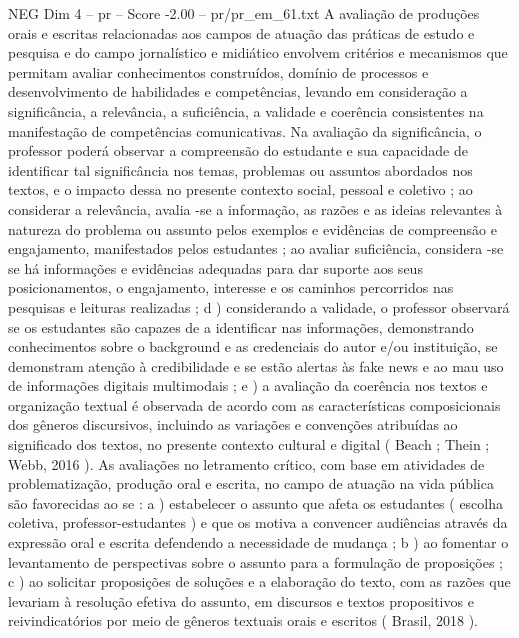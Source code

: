 \begin{textsample}{NEG Dim 4 – pr – Score -2.00 – pr/pr\_em\_61.txt}
A avaliação de produções orais e escritas relacionadas aos campos de atuação das práticas de estudo e pesquisa e do campo jornalístico e midiático envolvem critérios e mecanismos que permitam avaliar conhecimentos construídos, domínio de processos e desenvolvimento de habilidades e competências, levando em consideração a significância, a relevância, a suficiência, a validade e coerência consistentes na manifestação de competências comunicativas.
Na avaliação da significância, o professor poderá observar a compreensão do estudante e sua capacidade de identificar tal significância nos temas, problemas ou assuntos abordados nos textos, e o impacto dessa no presente contexto social, pessoal e coletivo ; ao considerar a relevância, avalia -se a informação, as razões e as ideias relevantes à natureza do problema ou assunto pelos exemplos e evidências de compreensão e engajamento, manifestados pelos estudantes ; ao avaliar suficiência, considera -se se há informações e evidências adequadas para dar suporte aos seus posicionamentos, o engajamento, interesse e os caminhos percorridos nas pesquisas e leituras realizadas ; d ) considerando a validade, o professor observará se os estudantes são capazes de a identificar nas informações, demonstrando conhecimentos sobre o background e as credenciais do autor e/ou instituição, se demonstram atenção à credibilidade e se estão alertas às fake news e ao mau uso de informações digitais multimodais ; e ) a avaliação da coerência nos textos e organização textual é observada de acordo com as características composicionais dos gêneros discursivos, incluindo as variações e convenções atribuídas ao significado dos textos, no presente contexto cultural e digital ( Beach ; Thein ; Webb, 2016 ).
As avaliações no letramento crítico, com base em atividades de problematização, produção oral e escrita, no campo de atuação na vida pública são favorecidas ao se : a ) estabelecer o assunto que afeta os estudantes ( escolha coletiva, professor-estudantes ) e que os motiva a convencer audiências através da expressão oral e escrita defendendo a necessidade de mudança ; b ) ao fomentar o levantamento de perspectivas sobre o assunto para a formulação de proposições ; c ) ao solicitar proposições de soluções e a elaboração do texto, com as razões que levariam à resolução efetiva do assunto, em discursos e textos propositivos e reivindicatórios por meio de gêneros textuais orais e escritos ( Brasil, 2018 ).

\end{textsample}
